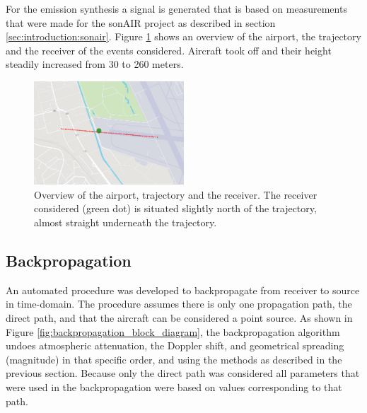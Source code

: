 
For the emission synthesis a signal is generated that is based on measurements
that were made for the sonAIR project as described in section
\ref{sec:introduction:sonair}. Figure \ref{fig:figure_trajectory} shows an
overview of the airport, the trajectory and the receiver of the events
considered. Aircraft took off and their height steadily increased from 30 to 260
meters.




\begin{figure}[H]
  \centering
  \includegraphics[width=0.5\textwidth]{../figures/manual/auralisation-paper/figure_trajectory}
  \caption{Overview of the airport, trajectory and the receiver. The receiver considered
(green dot) is situated slightly north of the trajectory, almost straight underneath the
trajectory.}
  \label{fig:figure_trajectory}
\end{figure}


\subsection{Backpropagation}
An automated procedure was developed to backpropagate from receiver to source in
time-domain. The procedure assumes there is only one propagation path,
the direct path, and that the aircraft can be considered a point source.
As shown in Figure \ref{fig:backpropagation_block_diagram}, the
backpropagation algorithm undoes atmospheric attenuation, the Doppler shift, and
geometrical spreading (magnitude) in that specific order, and using the methods as
described in the previous section.
Because only the direct path was considered all parameters that were used in the
backpropagation were based on values corresponding to that path.

